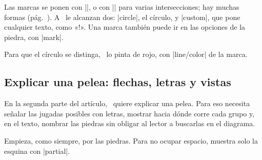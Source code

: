 \begin{goban}
Las marcas se ponen con |\mark|, o con |\marks| para varias intersecciones; hay muchas formas (pág.~\pageref{sec:marcas}). A \karu\ le alcanzan dos: |circle|, el círculo, y |custom|, que pone cualquier texto, como «!». Una marca también puede ir en las opciones de la piedra, con |mark|.

\begin{codeexample}[]
	\begin{goban}[partial = B2:E4, background = {line = false}]
	\end{goban}
\end{codeexample}

Para que el círculo se distinga, \karu\ lo pinta de rojo, con |line/color| de la marca.

\begin{codeexample}[]
	\begin{goban}[partial = B2:E4, background = {line = false}]
	\end{goban}
\end{codeexample}

\subsection{Explicar una pelea: flechas, letras y vistas}
\label{tut:pelea}

En la segunda parte del artículo, \karu\ quiere explicar una pelea. Para eso necesita señalar las jugadas posibles con letras, mostrar hacia dónde corre cada grupo y, en el texto, nombrar las piedras sin obligar al lector a buscarlas en el diagrama.

\begin{figure}[H]
	\centering
	\begin{goban}[partial = A1:G7, label = {at = {north, west}}]
	\end{goban}
\end{figure}

Empieza, como siempre, por las piedras. Para no ocupar espacio, muestra solo la esquina con |partial|.


\end{goban}
